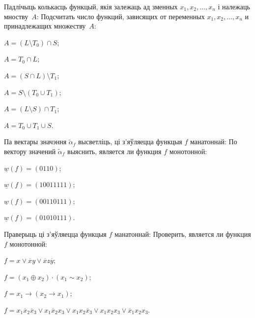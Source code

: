 \documentclass[12pt, a4paper]{article}
\begin{document}
\begin{problemList}
\smallskip

\problemItemWithCommonPart
{Падлічыць колькасць функцый, якія залежаць ад зменных $x_1, x_2, \ldots, x_n$ і належаць мноству~$A$:}
{Подсчитать число функций, зависящих от переменных $x_1, x_2, \ldots, x_n$ и принадлежащих множеству~$A$:}
{%
\begin{belarusianEnumerateMulticol}
    \item $A=(L\setminus T_0)\cap S$;
    \item $A=T_0\cap L$;
    \item $A=(S\cap L)\setminus T_1$;
    \item $A=S\setminus(T_0\cup T_1)$;
    \item $A=(L\setminus S)\cap T_1$;
    \item $A=T_0 \cup T_1 \cup S$.
\end{belarusianEnumerateMulticol}
}

\smallskip

\problemItemWithCommonPart
{Па вектары значэння $\tilde\alpha_f$ высветліць, ці з'яўляецца функцыя $f$ манатоннай:}
{По вектору значений $\tilde\alpha_f$ выяснить, является ли функция $f$ монотонной:}
{%
\begin{belarusianEnumerateMulticol}
    \item $\underline{w}(f)=(0110)$;
    \item $\underline{w}(f)=(10011111)$;
    \item $\underline{w}(f)=(00110111)$;
    \item $\underline{w}(f)=(01010111)$.
\end{belarusianEnumerateMulticol}
}

\smallskip

\problemItemWithCommonPart
{Праверыць ці з'яўляецца функцыя $f$ манатоннай:}
{Проверить, является ли функция $f$ монотонной:}
{%
\begin{belarusianEnumerate}
    \item $f=x\vee \overline{x}y\vee\overline{x}z\overline{y}$;
    \item $f=(x_1\oplus x_2)\cdot(x_1\sim x_2)$;
    \item $f=x_1\rightarrow (x_2 \rightarrow x_1)$;
    \item $f=x_1\overline{x}_2\overline{x}_3\vee x_1\overline{x}_2x_3\vee x_1x_2\overline{x}_3\vee x_1x_2x_3\vee \overline{x}_1x_2x_3$.
\end{belarusianEnumerate}
}

\smallskip


\end{problemList}
\end{document}
